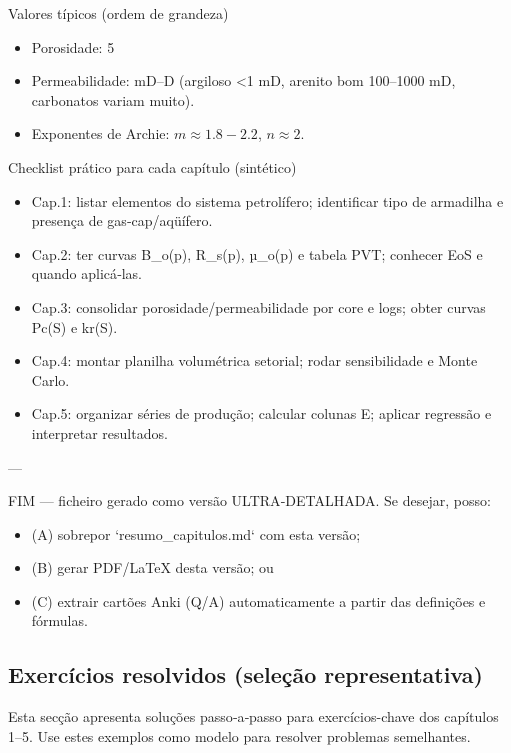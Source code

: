 \documentclass[11pt,a4paper]{article}
\begin{document}
Valores típicos (ordem de grandeza)
\begin{itemize}
\item Porosidade: 5%
\item Permeabilidade: mD–D (argiloso <1 mD, arenito bom 100–1000 mD, carbonatos variam muito).
\item Exponentes de Archie: $m\approx1.8-2.2$, $n\approx2$.
\end{itemize}

Checklist prático para cada capítulo (sintético)
\begin{itemize}
\item Cap.1: listar elementos do sistema petrolífero; identificar tipo de armadilha e presença de gas‑cap/aqüífero.
\item Cap.2: ter curvas B_o(p), R_s(p), µ_o(p) e tabela PVT; conhecer EoS e quando aplicá‑las.
\item Cap.3: consolidar porosidade/permeabilidade por core e logs; obter curvas Pc(S) e kr(S).
\item Cap.4: montar planilha volumétrica setorial; rodar sensibilidade e Monte Carlo.
\item Cap.5: organizar séries de produção; calcular colunas E; aplicar regressão e interpretar resultados.
\end{itemize}

---

FIM — ficheiro gerado como versão ULTRA‑DETALHADA. Se desejar, posso:
\begin{itemize}
\item (A) sobrepor `resumo_capitulos.md` com esta versão;
\item (B) gerar PDF/LaTeX desta versão; ou
\item (C) extrair cartões Anki (Q/A) automaticamente a partir das definições e fórmulas.
\end{itemize}

\subsection{Exercícios resolvidos (seleção representativa)}

Esta secção apresenta soluções passo‑a‑passo para exercícios-chave dos capítulos 1–5. Use estes exemplos como modelo para resolver problemas semelhantes.
\end{document}
